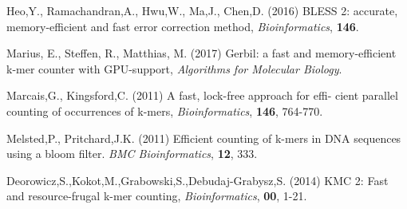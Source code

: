 \documentclass{bioinfo}
\begin{document}
\begin{thebibliography}{}

Heo,Y., Ramachandran,A., Hwu,W., Ma,J., Chen,D. (2016) BLESS 2: accurate, memory-efficient and fast error correction method, {\it Bioinformatics}, {\bf 146}.

Marius, E., Steffen, R., Matthias, M. (2017) Gerbil: a fast and memory-efficient k-mer counter with GPU-support, {\it Algorithms for Molecular Biology}.

Marcais,G., Kingsford,C. (2011)  A fast, lock-free approach for effi-
cient parallel counting of occurrences of k-mers, {\it Bioinformatics}, {\bf 146}, 764-770.

Melsted,P., Pritchard,J.K. (2011) Efficient counting of k-mers in DNA sequences
using a bloom filter. {\it BMC Bioinformatics}, {\bf 12}, 333.

Deorowicz,S.,Kokot,M.,Grabowski,S.,Debudaj-Grabysz,S. (2014) KMC 2: Fast and resource-frugal k-mer counting, {\it Bioinformatics}, {\bf 00}, 1-21.

\end{thebibliography}
\end{document}

